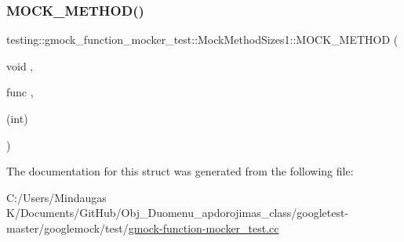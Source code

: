 \mbox{\label{structtesting_1_1gmock__function__mocker__test_1_1_mock_method_sizes1_af4255cca5805a41a3604efcda13a1a86}} 
\subsubsection{\texorpdfstring{MOCK\_METHOD()}{MOCK\_METHOD()}\hspace{0.1cm}{\footnotesize\ttfamily [2/2]}}
{\footnotesize\ttfamily testing\+::gmock\+\_\+function\+\_\+mocker\+\_\+test\+::\+Mock\+Method\+Sizes1\+::\+M\+O\+C\+K\+\_\+\+M\+E\+T\+H\+OD (\begin{DoxyParamCaption}\item[{void}]{,  }\item[{func}]{,  }\item[{(int)}]{ }\end{DoxyParamCaption})}



The documentation for this struct was generated from the following file\+:\begin{DoxyCompactItemize}
\item 
C\+:/\+Users/\+Mindaugas K/\+Documents/\+Git\+Hub/\+Obj\+\_\+\+Duomenu\+\_\+apdorojimas\+\_\+class/googletest-\/master/googlemock/test/\mbox{\hyperlink{googletest-master_2googlemock_2test_2gmock-function-mocker__test_8cc}{gmock-\/function-\/mocker\+\_\+test.\+cc}}\end{DoxyCompactItemize}
